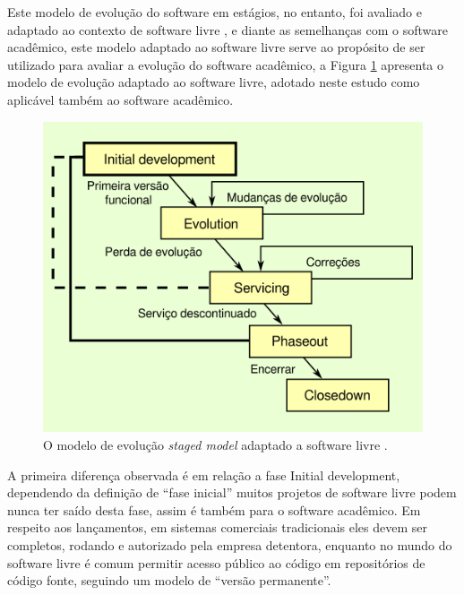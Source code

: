 

Este modelo de evolução do software em estágios, no entanto, foi avaliado e adaptado
ao contexto de software livre \cite{capiluppi2007adapting}, e diante as
semelhanças com o software acadêmico, este modelo adaptado ao software livre serve ao propósito de ser
utilizado para
avaliar a evolução do software acadêmico, a Figura \ref{staged-model-foss-cycle}
apresenta o modelo de evolução adaptado ao software livre, adotado
neste estudo como aplicável também ao software acadêmico.

\begin{figure}[h]
  \center
  \includegraphics[scale=0.6]{imagens/staged-model-foss-cycle.png}
  \caption{O modelo de evolução {\it staged model} adaptado a software livre \cite{capiluppi2007adapting}.}
  \label{staged-model-foss-cycle}
\end{figure}

A primeira diferença observada é em relação a fase Initial development,
dependendo da definição de ``fase inicial'' muitos projetos de software livre
podem nunca ter saído desta fase, assim é também para o software acadêmico. Em respeito aos lançamentos,
em sistemas comerciais tradicionais eles devem ser completos, rodando e autorizado
pela empresa detentora, enquanto no mundo do software livre é comum
permitir acesso público ao código em repositórios de código fonte, seguindo
um modelo de ``versão permanente''.

